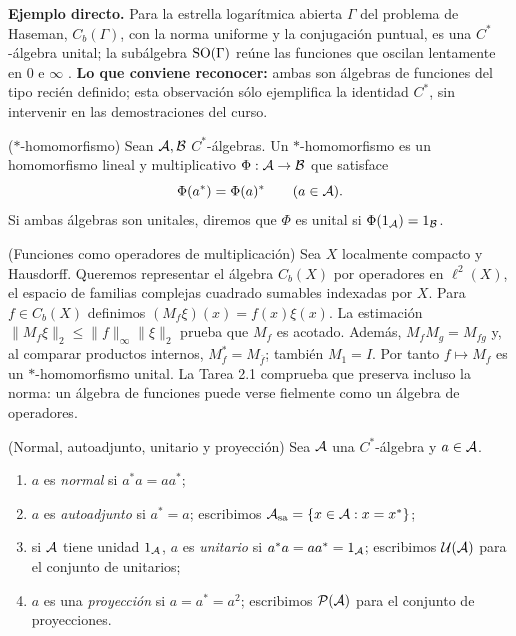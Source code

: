 \begin{investigacion}
\textbf{Ejemplo directo.} Para la estrella logarítmica abierta $\Gamma$ del problema de
Haseman, $C_b(\Gamma)$, con la norma uniforme y la conjugación puntual, es una
$C^*$-álgebra unital; la subálgebra $\operatorname{SO}(\Gamma)$ reúne las funciones que oscilan
lentamente en $0$ e $\infty$ \cite[§1, p.~464]{Karlovich2017}.
\textbf{Lo que conviene reconocer:} ambas son álgebras de funciones del tipo recién
definido; esta observación sólo ejemplifica la identidad $C^*$, sin intervenir en
las demostraciones del curso.
\end{investigacion}

\begin{cthdefinicion}{($*$-homomorfismo)}
Sean $\mathcal A,\mathcal B$ $C^*$-álgebras. Un $*$-homomorfismo es un homomorfismo lineal y multiplicativo
$\Phi:\mathcal A\to\mathcal B$ que satisface
\[
 \Phi(a^*)=\Phi(a)^*\qquad(a\in\mathcal A).
\]
Si ambas álgebras son unitales, diremos que $\Phi$ es unital si $\Phi(1_\mathcal A)=1_\mathcal B$.
\end{cthdefinicion}

\begin{cthejemplo}{(Funciones como operadores de multiplicación)}
Sea $X$ localmente compacto y Hausdorff. Queremos representar el álgebra
$C_b(X)$ por operadores en $\ell^2(X)$, el espacio de familias complejas
cuadrado sumables indexadas por $X$. Para $f\in C_b(X)$ definimos
$(M_f\xi)(x)=f(x)\xi(x)$. La estimación
$\|M_f\xi\|_2\le\|f\|_\infty\|\xi\|_2$ prueba que $M_f$ es acotado.
Además, $M_fM_g=M_{fg}$ y, al comparar productos internos,
$M_f^*=M_{\overline f}$; también $M_1=I$.
Por tanto $f\mapsto M_f$ es un $*$-homomorfismo unital.
La Tarea 2.1 comprueba que preserva incluso la norma: un álgebra de
funciones puede verse fielmente como un álgebra de operadores.
\end{cthejemplo}

\begin{cthdefinicion}{(Normal, autoadjunto, unitario y proyección)}
Sea $\mathcal A$ una $C^*$-álgebra y $a\in\mathcal A$.
\begin{enumerate}[label=(\roman*)]
\item $a$ es \emph{normal} si $a^*a=aa^*$;
\item $a$ es \emph{autoadjunto} si $a^*=a$; escribimos
$\mathcal A_{\mathrm{sa}}=\{x\in\mathcal A:x=x^*\}$;
\item si $\mathcal A$ tiene unidad $1_\mathcal A$, $a$ es \emph{unitario} si
$a^*a=aa^*=1_\mathcal A$; escribimos $\mathcal U(\mathcal A)$ para el conjunto de unitarios;
\item $a$ es una \emph{proyección} si $a=a^*=a^2$; escribimos
$\mathcal P(\mathcal A)$ para el conjunto de proyecciones.
\end{enumerate}
\end{cthdefinicion}

